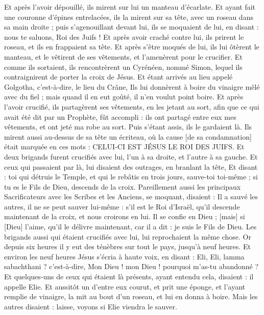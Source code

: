 \begin{multicols}{2}
Et après l'avoir dépouillé, ils mirent sur lui un manteau d'écarlate.
Et ayant fait une couronne d'épines entrelacées, ils la mirent sur sa tête, avec un roseau dans sa main droite ; puis s'agenouillant devant lui, ils se moquaient de lui, en disant : nous te saluons, Roi des Juifs !
Et après avoir craché contre lui, ils prirent le roseau, et ils en frappaient sa tête.
Et après s'être moqués de lui, ils lui ôtèrent le manteau, et le vêtirent de ses vêtements, et l'amenèrent pour le crucifier.
Et comme ils sortaient, ils rencontrèrent un Cyrénéen, nommé Simon, lequel ils contraignirent de porter la croix de Jésus.
Et étant arrivés au lieu appelé Golgotha, c'est-à-dire, le lieu du Crâne,
Ils lui donnèrent à boire du vinaigre mêlé avec du fiel ; mais quand il en eut goûté, il n'en voulut point boire.
Et après l'avoir crucifié, ils partagèrent ses vêtements, en les jetant au sort, afin que ce qui avait été dit par un Prophète, fût accompli : ils ont partagé entre eux mes vêtements, et ont jeté ma robe au sort.
Puis s'étant assis, ils le gardaient là.
Ils mirent aussi au-dessus de sa tête un écriteau, où la cause [de sa condamnation] était marquée en ces mots : CELUI-CI EST JÉSUS LE ROI DES JUIFS.
Et deux brigands furent crucifiés avec lui, l'un à sa droite, et l'autre à sa gauche.
Et ceux qui passaient par là, lui disaient des outrages, en branlant la tête,
Et disant : toi qui détruis le Temple, et qui le rebâtis en trois jours, sauve-toi toi-même ; si tu es le Fils de Dieu, descends de la croix.
Pareillement aussi les principaux Sacrificateurs avec les Scribes et les Anciens, se moquant, disaient :
Il a sauvé les autres, il ne se peut sauver lui-même : s'il est le Roi d'Israël, qu'il descende maintenant de la croix, et nous croirons en lui.
Il se confie en Dieu ; [mais] si [Dieu] l'aime, qu'il le délivre maintenant, car il a dit : je suis le Fils de Dieu.
Les brigands aussi qui étaient crucifiés avec lui, lui reprochaient la même chose.
Or depuis six heures il y eut des ténèbres sur tout le pays, jusqu'à neuf heures.
Et environ les neuf heures Jésus s'écria à haute voix, en disant : Eli, Eli, lamma sabachthani ? c'est-à-dire, Mon Dieu ! mon Dieu ! pourquoi m'as-tu abandonné ?
Et quelques-uns de ceux qui étaient là présents, ayant entendu cela, disaient : il appelle Elie.
Et aussitôt un d'entre eux courut, et prit une éponge, et l'ayant remplie de vinaigre, la mit au bout d'un roseau, et lui en donna à boire.
Mais les autres disaient : laisse, voyons si Elie viendra le sauver.

\end{multicols}

